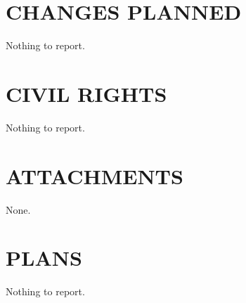 \documentclass[12pt,letterpaper,english,bibliography=totocnumbered,abstract=on]{scrartcl}
\begin{document}
\section{CHANGES PLANNED}


Nothing to report.

\section{CIVIL RIGHTS}


Nothing to report.

\section{ATTACHMENTS}


None.

\section{PLANS}


Nothing to report.
\end{document}
